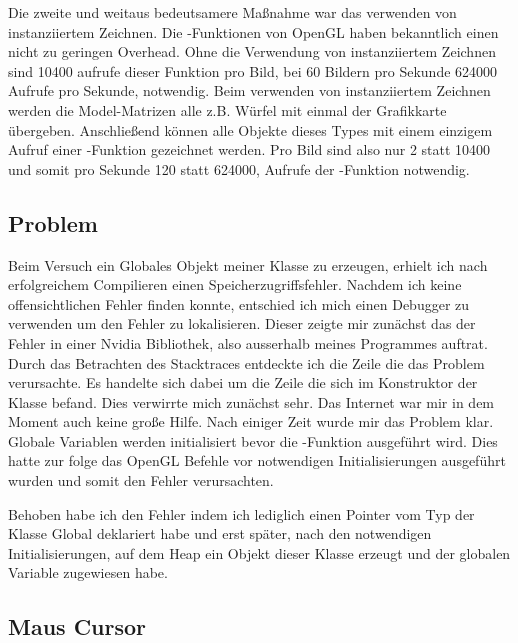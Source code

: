 \documentclass{article}
\begin{document}
Die zweite und weitaus bedeutsamere Maßnahme war das verwenden von instanziiertem Zeichnen.
Die -Funktionen von OpenGL haben bekanntlich einen nicht zu geringen Overhead. Ohne die Verwendung
von instanziiertem Zeichnen sind 10400 aufrufe dieser Funktion pro Bild, bei 60 Bildern pro Sekunde 624000 Aufrufe
pro Sekunde, notwendig. Beim verwenden von instanziiertem Zeichnen werden die Model-Matrizen alle z.B. Würfel mit
einmal der Grafikkarte übergeben. Anschließend können alle Objekte dieses Types mit einem einzigem Aufruf einer
-Funktion gezeichnet werden. Pro Bild sind also nur 2 statt 10400 und somit pro Sekunde 120 statt 624000,
Aufrufe der -Funktion notwendig.

\subsection{Problem}
Beim Versuch ein Globales Objekt meiner Klasse  zu erzeugen, erhielt ich nach erfolgreichem Compilieren
einen Speicherzugriffsfehler. Nachdem ich keine offensichtlichen Fehler finden konnte, entschied ich mich einen
Debugger zu verwenden um den Fehler zu lokalisieren. Dieser zeigte mir zunächst das der Fehler in einer Nvidia
Bibliothek, also ausserhalb meines Programmes auftrat. Durch das Betrachten des Stacktraces entdeckte ich die
Zeile die das Problem verursachte. Es handelte sich dabei um die Zeile 
die sich im Konstruktor der Klasse  befand. Dies verwirrte mich zunächst sehr. Das Internet war mir 
in dem Moment auch keine große Hilfe. Nach einiger Zeit wurde mir das Problem klar. Globale Variablen werden
initialisiert bevor die -Funktion ausgeführt wird. Dies hatte zur folge das OpenGL Befehle vor notwendigen
Initialisierungen ausgeführt wurden und somit den Fehler verursachten.\par\medskip

Behoben habe ich den Fehler indem ich lediglich einen Pointer vom Typ der Klasse  Global deklariert habe
und erst später, nach den notwendigen Initialisierungen, auf dem Heap ein Objekt dieser Klasse erzeugt und der
globalen Variable zugewiesen habe.

\subsection{Maus Cursor}
\newpage
\printbibliography
\end{document}
